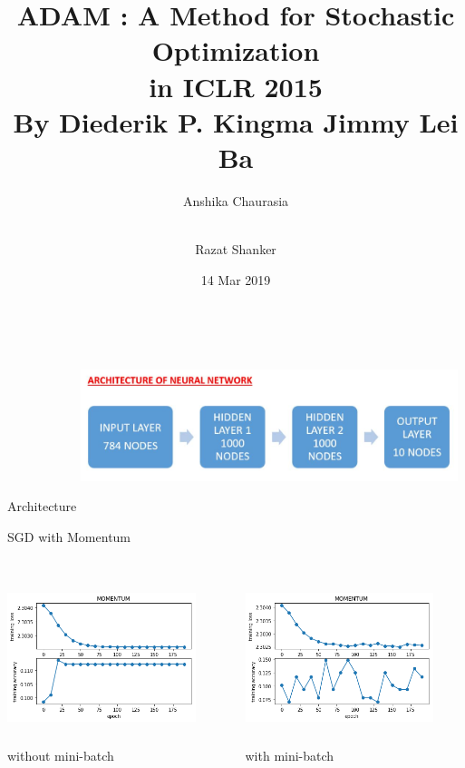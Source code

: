 \documentclass{beamer}
\title[ADAM] %
{ADAM : A Method for Stochastic Optimization \\ in ICLR 2015 \\ By Diederik P. Kingma \hspace{1cm} Jimmy Lei Ba}
\author[Anshika,Razat] %
{Anshika Chaurasia \and \\Razat Shanker}
\institute[VFU] %
{
  
  EE18MTECH11017\\
  EE18MTECH11016
 
 }
\date[VLC 2013] %
{14 Mar 2019}
\begin{document}
 
\frame{\titlepage}

\begin{frame}{Architecture}
    \includegraphics[width=11cm,height=5cm,angle=0]{architecture}
\end{frame}

\begin{frame}{SGD with Momentum}
 \begin{columns}
    \begin{column}{0.5\textwidth}
          \includegraphics[width=5.5cm,height=5cm,angle=0]{mom_mini.png}\\
          \centering
          without mini-batch
    \end{column}
    \begin{column}{0.5\textwidth}
          \includegraphics[width=5.5cm,height=5cm,angle=0]{mom.png}\\
          \centering
          with mini-batch
    \end{column}
 \end{columns}
\end{frame}
\end{document}
